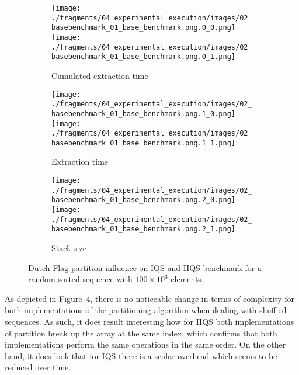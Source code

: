 \begin{figure}
    \centering
    \begin{subfigure}[b]{\textwidth}
        \centering
        \texttt{[image: ./fragments/04\_experimental\_execution/images/02\_basebenchmark\_01\_base\_benchmark.png.0\_0.png]}
        \texttt{[image: ./fragments/04\_experimental\_execution/images/02\_basebenchmark\_01\_base\_benchmark.png.0\_1.png]}
        \caption{Cumulated extraction time}
        \label{FIG:PARTITION_SCHEME_01_SHUFFLED__0_0}
    \end{subfigure}

    \begin{subfigure}[b]{\textwidth}
        \centering
        \texttt{[image: ./fragments/04\_experimental\_execution/images/02\_basebenchmark\_01\_base\_benchmark.png.1\_0.png]}
        \texttt{[image: ./fragments/04\_experimental\_execution/images/02\_basebenchmark\_01\_base\_benchmark.png.1\_1.png]}
        \caption{Extraction time}
        \label{FIG:PARTITION_SCHEME_01_SHUFFLED__0_1}
    \end{subfigure}

    \begin{subfigure}[b]{\textwidth}
        \centering
        \texttt{[image: ./fragments/04\_experimental\_execution/images/02\_basebenchmark\_01\_base\_benchmark.png.2\_0.png]}
        \texttt{[image: ./fragments/04\_experimental\_execution/images/02\_basebenchmark\_01\_base\_benchmark.png.2\_1.png]}
        \caption{Stack size}
        \label{FIG:PARTITION_SCHEME_01_SHUFFLED__0_2}
    \end{subfigure}
    
    \caption{Dutch Flag partition influence on IQS and IIQS benchmark for a random sorted sequence with $100\times10^3$ elements.}
    \label{FIG:PARTITION_SCHEME_01_SHUFFLED}
\end{figure}


As depicted in Figure~\ref{FIG:PARTITION_SCHEME_01_SHUFFLED}, there is no noticeable change in terms of complexity for both implementations of the partitioning algorithm when dealing with shuffled sequences. As such, it does result interesting how for IIQS both implementations of partition break up the array at the same index, which confirms that both implementations perform the same operations in the same order. On the other hand, it does look that for IQS there is a scalar overhead which seems to be reduced over time. \\



